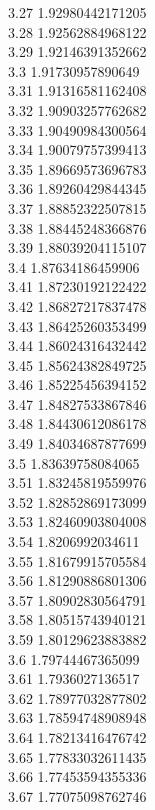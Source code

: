 {3.27	1.92980442171205\\
3.28	1.92562884968122\\
3.29	1.92146391352662\\
3.3	1.91730957890649\\
3.31	1.91316581162408\\
3.32	1.90903257762682\\
3.33	1.90490984300564\\
3.34	1.90079757399413\\
3.35	1.89669573696783\\
3.36	1.89260429844345\\
3.37	1.88852322507815\\
3.38	1.88445248366876\\
3.39	1.88039204115107\\
3.4	1.87634186459906\\
3.41	1.87230192122422\\
3.42	1.86827217837478\\
3.43	1.86425260353499\\
3.44	1.86024316432442\\
3.45	1.85624382849725\\
3.46	1.85225456394152\\
3.47	1.84827533867846\\
3.48	1.84430612086178\\
3.49	1.84034687877699\\
3.5	1.83639758084065\\
3.51	1.83245819559976\\
3.52	1.82852869173099\\
3.53	1.82460903804008\\
3.54	1.8206992034611\\
3.55	1.81679915705584\\
3.56	1.81290886801306\\
3.57	1.80902830564791\\
3.58	1.80515743940121\\
3.59	1.80129623883882\\
3.6	1.79744467365099\\
3.61	1.7936027136517\\
3.62	1.78977032877802\\
3.63	1.78594748908948\\
3.64	1.78213416476742\\
3.65	1.77833032611435\\
3.66	1.77453594355336\\
3.67	1.77075098762746\\
}
